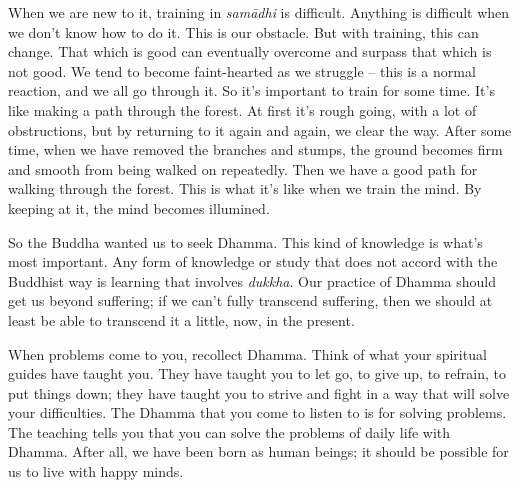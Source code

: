 When we are new to it, training in \emph{samādhi} is difficult. Anything
is difficult when we don't know how to do it. This is our obstacle. But
with training, this can change. That which is good can eventually
overcome and surpass that which is not good. We tend to become
faint-hearted as we struggle -- this is a normal reaction, and we all go
through it. So it's important to train for some time. It's like making a
path through the forest. At first it's rough going, with a lot of
obstructions, but by returning to it again and again, we clear the way. 
After some time, when we have removed the branches and stumps, the
ground becomes firm and smooth from being walked on repeatedly. Then we
have a good path for walking through the forest. This is what it's like
when we train the mind. By keeping at it, the mind becomes illumined. 

So the Buddha wanted us to seek Dhamma. This kind of knowledge is what's
most important. Any form of knowledge or study that does not accord with
the Buddhist way is learning that involves \emph{dukkha}. Our practice
of Dhamma should get us beyond suffering; if we can't fully transcend
suffering, then we should at least be able to transcend it a little, 
now, in the present. 

When problems come to you, recollect Dhamma. Think of what your
spiritual guides have taught you. They have taught you to let go, to
give up, to refrain, to put things down; they have taught you to strive
and fight in a way that will solve your difficulties. The Dhamma that
you come to listen to is for solving problems. The teaching tells you
that you can solve the problems of daily life with Dhamma. After all, we
have been born as human beings; it should be possible for us to live
with happy minds. 

